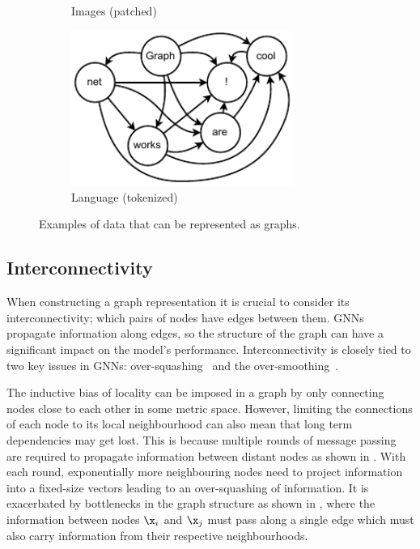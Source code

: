 \begin{figure}
\begin{subfigure}[b]{0.45\textwidth}
        \caption{Images (patched)}
        \label{fig:dog}
    \end{subfigure}
    \begin{subfigure}[b]{0.45\textwidth}
        \centering
        \includegraphics[width=0.8\textwidth]{Figures/graph_networks/text.pdf}
        \caption{Language (tokenized)}
        \label{fig:text}
    \end{subfigure}
    \caption{Examples of data that can be represented as graphs.}
    \label{fig:graph_examples}
\end{figure}

\subsection{Interconnectivity}

When constructing a graph representation it is crucial to consider its interconnectivity; which pairs of nodes have edges between them.
GNNs propagate information along edges, so the structure of the graph can have a significant impact on the model's performance.
Interconnectivity is closely tied to two key issues in GNNs: over-squashing~\cite{OverSquashing} and the over-smoothing~\cite{OverSmoothing}.

The inductive bias of locality can be imposed in a graph by only connecting nodes close to each other in some metric space.
However, limiting the connections of each node to its local neighbourhood can also mean that long term dependencies may get lost.
This is because multiple rounds of message passing are required to propagate information between distant nodes as shown in .
With each round, exponentially more neighbouring nodes need to project information into a fixed-size vectors leading to an over-squashing of information.
It is exacerbated by bottlenecks in the graph structure as shown in , where the information between nodes $\x_i$ and $\x_j$ must pass along a single edge which must also carry information from their respective neighbourhoods.

